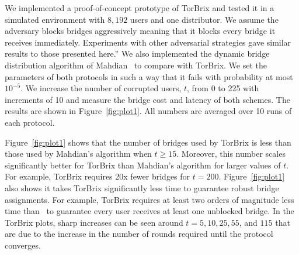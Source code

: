 \documentclass{llncs}
\newcommand{\sfsize}{\fontsize{0.73\baselineskip}{0.73\baselineskip}\selectfont}
\newcommand{\sans}[1]{\textsf{\sfsize \mbox{#1}}}
\newcommand{\brix}{\sans{TorBrix}\xspace}
\begin{document}
We implemented a proof-of-concept prototype of \brix and tested it in a simulated environment with $8,192$ users and one distributor. We assume the adversary blocks bridges aggressively meaning that it blocks every bridge it receives immediately. Experiments with other adversarial strategies gave similar results to those presented here.”%
We also implemented the dynamic bridge distribution algorithm of Mahdian~\cite{Mahdian:2010} to compare with \brix. We set the parameters of both protocols in such a way that it fails with probability at most $10^{-5}$. We increase the number of corrupted users, $t$, from 0 to 225 with increments of 10 and measure the bridge cost and latency of both schemes. The results are shown in Figure~\ref{fig:plot1}. All numbers are averaged over 10 runs of each protocol.

Figure~\ref{fig:plot1} shows that the number of bridges used by \brix is less than those used by Mahdian's algorithm when ${t\geq15}$. Moreover, this number scales significantly better for \brix than Mahdian's algorithm for larger values of $t$. For example, \brix requires 20x fewer bridges for ${t=200}$. Figure~\ref{fig:plot1} also shows it takes \brix significantly less time to guarantee robust bridge assignments. For example, \brix requires at least two orders of magnitude less time than~\cite{Mahdian:2010} to guarantee every user receives at least one unblocked bridge. In the \brix plots, sharp increases can be seen around $t=5, 10, 25, 55$, and $115$ that are due to the increase in the number of rounds required until the protocol converges.

\end{document}
